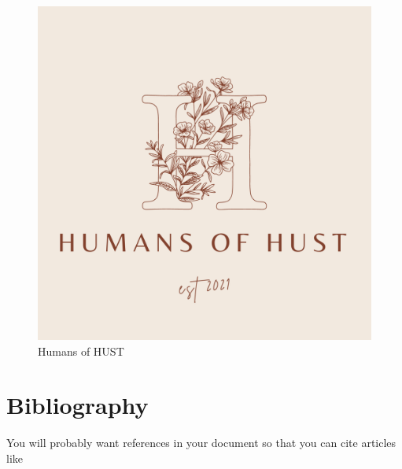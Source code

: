 \documentclass[15pt, a4paper]{article}
\begin{document}
    \begin{figure}[htp]
        \centering
        \includegraphics[scale = .5]{materials/avatar.png}
        \caption{Humans of HUST}
        \label{Humans of HUST}
        \end{figure}
    
    
    \section{Bibliography}
    You will probably want references in your document so that you can cite articles like \cite{frenkel_fine_2013, frenkel_optical_2013, frenkel_temperature_2012, frenkel_whispering-gallery_2013,frenkel_-chip_2016}
    
     
    
\end{document}
